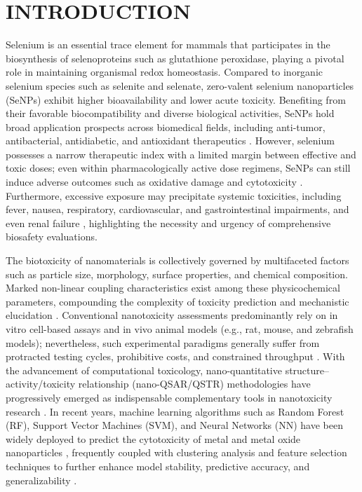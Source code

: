 \section{INTRODUCTION}

Selenium is an essential trace element for mammals that participates in the biosynthesis of selenoproteins such as glutathione peroxidase, playing a pivotal role in maintaining organismal redox homeostasis. Compared to inorganic selenium species such as selenite and selenate, zero-valent selenium nanoparticles (SeNPs) exhibit higher bioavailability and lower acute toxicity. Benefiting from their favorable biocompatibility and diverse biological activities, SeNPs hold broad application prospects across biomedical fields, including anti-tumor, antibacterial, antidiabetic, and antioxidant therapeutics \cite{hosnedlova2018nanoselenium,bisht2022senps,sowmya2024nanoselenium,karthik2024senps}. However, selenium possesses a narrow therapeutic index with a limited margin between effective and toxic doses; even within pharmacologically active dose regimens, SeNPs can still induce adverse outcomes such as oxidative damage and cytotoxicity \cite{wang2020prooxidation}. Furthermore, excessive exposure may precipitate systemic toxicities, including fever, nausea, respiratory, cardiovascular, and gastrointestinal impairments, and even renal failure \cite{hosnedlova2018nanoselenium}, highlighting the necessity and urgency of comprehensive biosafety evaluations.

The biotoxicity of nanomaterials is collectively governed by multifaceted factors such as particle size, morphology, surface properties, and chemical composition. Marked non-linear coupling characteristics exist among these physicochemical parameters, compounding the complexity of toxicity prediction and mechanistic elucidation \cite{ji2025rosml}. Conventional nanotoxicity assessments predominantly rely on in vitro cell-based assays and in vivo animal models (e.g., rat, mouse, and zebrafish models); nevertheless, such experimental paradigms generally suffer from protracted testing cycles, prohibitive costs, and constrained throughput \cite{ahmadi2024toxicity}. With the advancement of computational toxicology, nano-quantitative structure--activity/toxicity relationship (nano-QSAR/QSTR) methodologies have progressively emerged as indispensable complementary tools in nanotoxicity research \cite{roy2023tio2}. In recent years, machine learning algorithms such as Random Forest (RF), Support Vector Machines (SVM), and Neural Networks (NN) have been widely deployed to predict the cytotoxicity of metal and metal oxide nanoparticles \cite{zhang2023qsar}, frequently coupled with clustering analysis and feature selection techniques to further enhance model stability, predictive accuracy, and generalizability \cite{sang2022mlcytotoxicity}.

